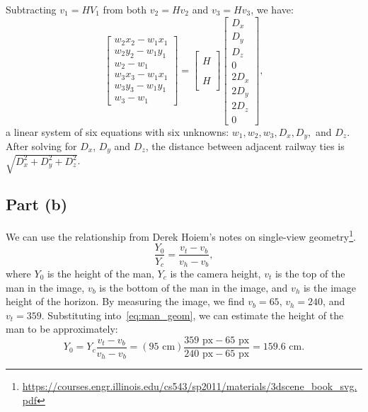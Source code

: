 \documentclass[12pt]{article}
\begin{document}
Subtracting $v_1 = HV_1$ from both $v_2 = Hv_2$ and $v_3 = Hv_3$, we have:
%
\begin{equation}
    \begin{bmatrix} w_2 x_2 - w_1 x_1 \\
        w_2 y_2 - w_1 y_1 \\
        w_2 - w_1 \\
        w_3 x_3 - w_1 x_1 \\
        w_3 y_3 - w_1 y_1 \\
        w_3 - w_1
    \end{bmatrix} = \begin{bmatrix} \, \\ H \\ \, \\ \, \\ H \\ \, \end{bmatrix}
                    \begin{bmatrix} D_x \\ D_y \\ D_z \\ 0 \\ 2D_x \\ 2D_y \\ 2D_z \\ 0 \end{bmatrix},
\end{equation}
%
a linear system of six equations with six unknowns: $w_1, w_2, w_3, D_x, D_y,$
and $D_z$. After solving for $D_x$, $D_y$ and $D_z$, the distance between
adjacent railway ties is $\sqrt{D_x^2 + D_y^2 + D_z^2}$.

\subsection*{Part (b)}

We can use the relationship from Derek Hoiem's notes on single-view
geometry\footnote{\url{https://courses.engr.illinois.edu/cs543/sp2011/materials/3dscene_book_svg.pdf}}.
%
\begin{equation}
    \frac{Y_0}{Y_c} = \frac{v_t - v_b}{v_h - v_b},
    \label{eq:man_geom}
\end{equation}
%
where $Y_0$ is the height of the man, $Y_c$ is the camera height, $v_t$ is
the top of the man in the image, $v_b$ is the bottom of the man in the image,
and $v_h$ is the image height of the horizon. By measuring the image, we find
$v_b = 65$, $v_h = 240$, and $v_t = 359$. Substituting into~\eqref{eq:man_geom},
we can estimate the height of the man to be approximately:
%
\begin{equation}
    Y_0 = Y_c \frac{v_t - v_b}{v_h - v_b} = (95 \text{ cm}) \frac{359 \text{ px} - 65 \text{ px}}
    {240 \text{ px} - 65 \text{ px}} = 159.6 \text{ cm}.
\end{equation}
\end{document}
